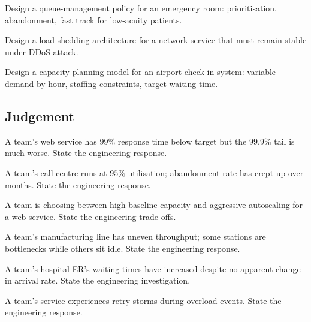 \begin{exercise}
Design a queue-management policy for an emergency room: prioritisation, abandonment, fast track for low-acuity patients.
\end{exercise}

\begin{exercise}
Design a load-shedding architecture for a network service that must remain stable under DDoS attack.
\end{exercise}

\begin{exercise}
Design a capacity-planning model for an airport check-in system: variable demand by hour, staffing constraints, target waiting time.
\end{exercise}

\subsection*{Judgement}

\begin{exercise}
A team's web service has $99\%$ response time below target but the $99.9\%$ tail is much worse. State the engineering response.
\end{exercise}

\begin{exercise}
A team's call centre runs at $95\%$ utilisation; abandonment rate has crept up over months. State the engineering response.
\end{exercise}

\begin{exercise}
A team is choosing between high baseline capacity and aggressive autoscaling for a web service. State the engineering trade-offs.
\end{exercise}

\begin{exercise}
A team's manufacturing line has uneven throughput; some stations are bottlenecks while others sit idle. State the engineering response.
\end{exercise}

\begin{exercise}
A team's hospital ER's waiting times have increased despite no apparent change in arrival rate. State the engineering investigation.
\end{exercise}

\begin{exercise}
A team's service experiences retry storms during overload events. State the engineering response.
\end{exercise}

